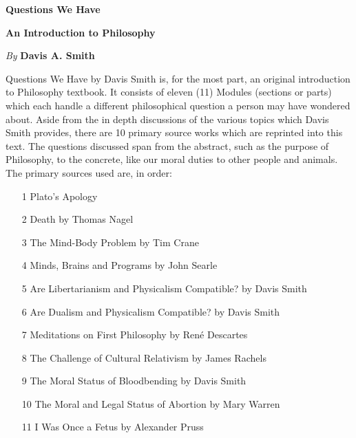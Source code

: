 \thispagestyle{empty}

\pagestyle{empty}

\vspace*{80pt}

\begin{raggedleft}
\fontsize{30pt}{24pt}\sffamily
\selectfont
  \textbf{Questions We Have }

\medskip\fontsize{18pt}{20pt}\selectfont

\textbf{An Introduction to Philosophy}

\vfill
\fontsize{12pt}{16pt}\selectfont \textit{By }  \textbf{Davis A. Smith}\\
\end{raggedleft}

\newpage

\noindent%
Questions We Have by Davis Smith is, for the most part, an original introduction to Philosophy textbook. It consists of eleven (11) Modules (sections or parts) which each handle a different philosophical question a person may have wondered about. Aside from the in depth discussions of the various topics which Davis Smith provides, there are 10 primary source works which are reprinted into this text. The questions discussed span from the abstract, such as the purpose of Philosophy, to the concrete, like our moral duties to other people and animals. 
The primary sources used are, in order:
\begin{enumerate}
\item[1] Plato's Apology
\item[2] Death by Thomas Nagel
\item[3] The Mind-Body Problem by Tim Crane
\item[4] Minds, Brains and Programs by John Searle
\item[5] Are Libertarianism and Physicalism Compatible? by Davis Smith
\item[6] Are Dualism and Physicalism Compatible? by Davis Smith
\item[7] Meditations on First Philosophy by Ren\'e Descartes
\item[8] The Challenge of Cultural Relativism by James Rachels
\item[9] The Moral Status of Bloodbending by Davis Smith
\item[10] The Moral and Legal Status of Abortion by Mary Warren
\item[11] I Was Once a Fetus by Alexander Pruss
\end{enumerate}

